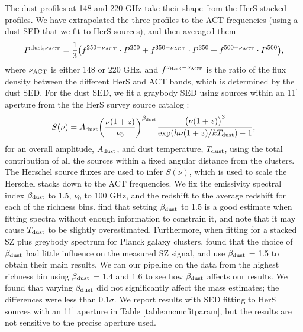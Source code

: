 \documentclass[a4paper,fleqn,usenatbib]{mnras}
\begin{document}
The dust profiles at 148 and 220 GHz take their shape from the HerS stacked profiles.  We have extrapolated the three profiles to the ACT frequencies (using a dust SED that we fit to HerS sources), and then averaged them
\begin{equation}
    P^{\rm dust,\nu_{\rm ACT}} = \frac{1}{3} \big ( f^{250-\nu_{\rm ACT}} \cdot P^{250} + f^{350-\nu_{\rm ACT}} \cdot P^{350} + f^{500-\nu_{\rm ACT}} \cdot P^{500} \big ),
\end{equation}
where $\nu_{\rm ACT}$ is either 148 or 220 GHz, and $f^{\nu_{\rm HerS}-\nu_{\rm ACT}}$ is the ratio of the flux density between the different HerS and ACT bands, which is determined by the dust SED.
For the dust SED, we fit a graybody SED using sources within an 11$^\prime$ aperture from the the HerS survey source catalog \citep{2014ApJS..210...22V}:
\begin{equation}
  \label{eq:dustSED}
  \centering
  S(\nu) = A_{\rm dust}  \bigg(\frac{\nu(1+z)}{\nu_0}\bigg)^{\beta_{\rm dust}} \frac{\big(\nu(1+z)\big)^{3} }{{\exp({h \nu (1+z) / k T_{\rm dust}}) - 1}},
\end{equation}
for an overall amplitude, $A_{\rm dust}$, and dust temperature, $T_{\rm dust}$, using the total contribution of all the sources within a fixed angular distance from the clusters. 
The Herschel source fluxes are used to infer $S(\nu)$, which is used to scale the Herschel stacks down to the ACT frequencies. 
We fix the emissivity spectral index $\beta_{\rm dust}$ to 1.5, $\nu_0$ to 100 GHz, and the redshift to the average redshift for each of the richness bins. 
\cite{2014A&A...561A..86M} find that setting $\beta_{\rm dust}$ to 1.5 is a good estimate when fitting spectra without enough information to constrain it, and note that it may cause $T_{\rm dust}$ to be slightly overestimated. 
Furthermore, when fitting for a stacked SZ plus greybody spectrum for Planck galaxy clusters, \cite{2018MNRAS.476.3360E} found that the choice of $\beta_{\rm dust}$ had little influence on the measured SZ signal, and use $\beta_{\rm dust}$ = 1.5 to obtain their main results. 
We ran our pipeline on the data from the highest richness bin using $\beta_{\rm dust}$ = 1.4 and 1.6 to see how $\beta_{\rm dust}$ affects our results. We found that varying $\beta_{\rm dust}$ did not significantly affect the mass estimates; the differences were less than 0.1$\sigma$. 
We report results with SED fitting to HerS sources with an 11$^\prime$ aperture in Table \ref{table:mcmcfitparam}, but the results are not sensitive to the precise aperture used.
\end{document}
